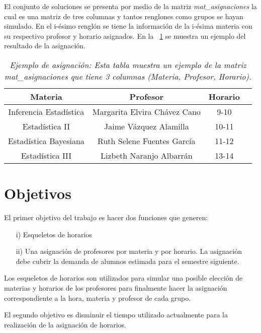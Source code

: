 El conjunto de soluciones se presenta por medio de la matriz \textit{mat\_asignaciones} la cual es una matriz de tres columnas y tantos renglones como grupos se hayan simulado. En el i-ésimo renglón se tiene la información de la i-ésima materia con su respectivo profesor y horario asignados. En la \tablename{~\ref{EjAsig}} se muestra un ejemplo del resultado de la asignación.

\begin{table}[H]
\centering
\begin{tabular}{|c|c|c|c|}
\hline 
\textbf{Materia} & \textbf{Profesor} & \textbf{Horario} \\ 
\hline 
Inferencia Estadística & Margarita Elvira Chávez Cano & 9-10 \\ 
\hline 
Estadística II & Jaime Vázquez Alamilla & 10-11 \\ 
\hline 
Estadística Bayesiana  & Ruth Selene Fuentes García & 11-12 \\ 
\hline 
Estadística III  & Lizbeth Naranjo Albarrán & 13-14 \\ 
\hline 
\end{tabular}  
\caption[\textit{Ejemplo de asignación}]{\textit{Ejemplo de asignación: Esta tabla muestra un ejemplo de la matriz mat\_asignaciones que tiene 3 columnas (Materia, Profesor, Horario).}}\label{EjAsig}
\end{table}


\section{Objetivos}

El primer objetivo del trabajo es hacer dos funciones que generen:
  
  \begin{enumerate}
\item[i)] Esqueletos de horarios

\item[ii)] Una asignación de profesores por materia y por horario. La asignación debe cubrir la demanda de alumnos estimada para el semestre siguiente.
\end{enumerate}


Los esqueletos de horarios son utilizados para simular una posible elección de materias y horarios de los profesores para finalmente hacer la asignación correspondiente a la hora, materia y profesor de cada grupo.

El segundo objetivo es disminuir el tiempo utilizado actualmente para la realización de la asignación de horarios.


